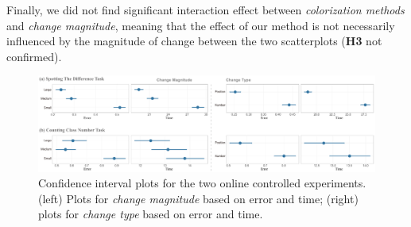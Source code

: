 {%


Finally, we did not find significant interaction effect between \emph{colorization methods} and \emph{change magnitude}, meaning that the effect of our method is not necessarily influenced by the magnitude of change between the two scatterplots (\textbf{H3} not confirmed).

\begin{figure}[h]
\centering
\includegraphics[width=1\linewidth]{figures/user-result-formal-variables.pdf}
\caption{Confidence interval plots for the two online controlled experiments. (left) Plots for \emph{change magnitude} based on error and time; (right) plots for \emph{change type} based on error and time.}
\vspace*{-3mm}
\label{fig:userResultsVar}
\end{figure}

}
